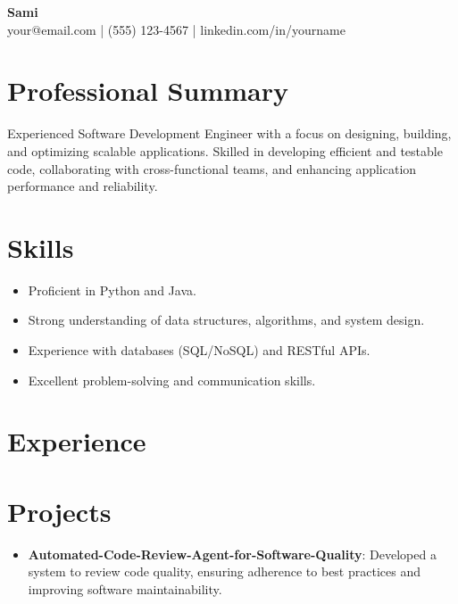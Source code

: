 \documentclass[11pt,a4paper]{article}
\begin{document}
\begin{center}
{\LARGE \textbf{Sami}} \\[4pt]
your@email.com \quad | \quad (555) 123-4567 \quad | \quad linkedin.com/in/yourname
\end{center}

\vspace{8pt}

\section*{Professional Summary}
Experienced Software Development Engineer with a focus on designing, building, and optimizing scalable applications. Skilled in developing efficient and testable code, collaborating with cross-functional teams, and enhancing application performance and reliability.

\section*{Skills}
\begin{itemize} \item Proficient in Python and Java. \item Strong understanding of data structures, algorithms, and system design. \item Experience with databases (SQL/NoSQL) and RESTful APIs. \item Excellent problem-solving and communication skills. \end{itemize}

\section*{Experience}

\section*{Projects}
\begin{itemize} \item \textbf{Automated-Code-Review-Agent-for-Software-Quality}: Developed a system to review code quality, ensuring adherence to best practices and improving software maintainability. \end{itemize}
\end{document}
